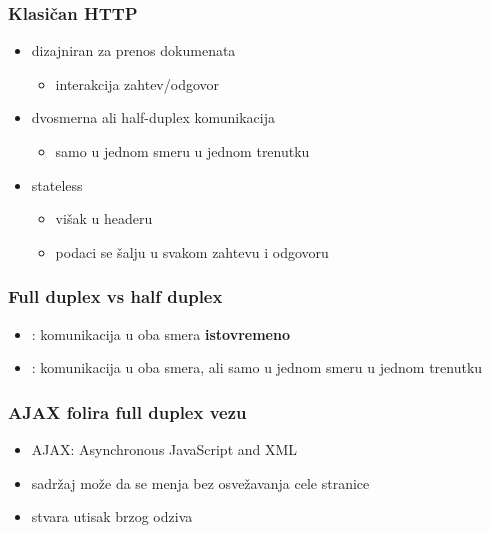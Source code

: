 \documentclass[compress]{beamer}
\begin{document}
\begin{frame}
  \frametitle{Klasičan HTTP}
  \begin{itemize}
    \item dizajniran za prenos dokumenata
    \begin{itemize}
      \item interakcija zahtev/odgovor
    \end{itemize}  
    \item dvosmerna ali half-duplex komunikacija
    \begin{itemize}
      \item samo u jednom smeru u jednom trenutku
    \end{itemize}  
    \item stateless
    \begin{itemize}
      \item višak u headeru
      \item podaci se šalju u svakom zahtevu i odgovoru
    \end{itemize}  
  \end{itemize}  
\end{frame}

\begin{frame}
  \frametitle{Full duplex vs half duplex}
  \begin{itemize}
    \item {}: komunikacija u oba smera \textbf{istovremeno}
    \item {}: komunikacija u oba smera, ali samo u jednom smeru u jednom trenutku
  \end{itemize}  
\end{frame}

\begin{frame}
  \frametitle{AJAX folira full duplex vezu}
  \begin{itemize}
    \item AJAX: Asynchronous JavaScript and XML
    \item sadržaj može da se menja bez osvežavanja cele stranice
    \item stvara utisak brzog odziva
  \end{itemize}
\end{frame}
\end{document}
